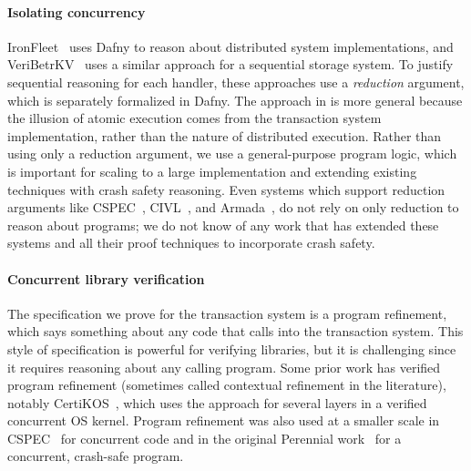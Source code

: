\paragraph{Isolating concurrency}
IronFleet~\cite{hawblitzel:ironfleet} uses Dafny to reason about distributed
system implementations, and VeriBetrKV~\cite{hance:veribetrkv} uses a similar
approach for a sequential storage system. To justify sequential reasoning for
each handler, these approaches use a \emph{reduction} argument, which is
separately formalized in Dafny. The approach in \sys is more general because the
illusion of atomic execution comes from the transaction system implementation,
rather than the nature of distributed execution. Rather than using only a
reduction argument, we use a general-purpose program logic, which is important
for scaling to a large implementation and extending existing techniques with
crash safety reasoning. Even systems which support reduction arguments like
CSPEC~\cite{chajed:cspec}, CIVL~\cite{hawblitzel:civl}, and
Armada~\cite{lorch:armada}, do not rely on only reduction to reason about
programs; we do not know of any work that has extended these systems and all
their proof techniques to incorporate crash safety.



\paragraph{Concurrent library verification}

The specification we prove for the transaction system is a program refinement,
which says something about any code that calls into the transaction system. This
style of specification is powerful for verifying libraries, but it is
challenging since it requires reasoning about any calling program. Some prior
work has verified program refinement (sometimes called contextual refinement in
the literature), notably CertiKOS~\cite{gu:certikos-ccal}, which uses the
approach for several layers in a verified concurrent OS kernel. Program
refinement was also used at a smaller scale in CSPEC~\cite{chajed:cspec} for
concurrent code and in the original Perennial work~\cite{chajed:perennial} for a
concurrent, crash-safe program.


